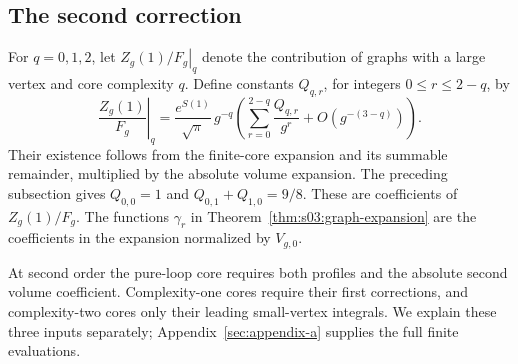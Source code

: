 \subsection{The second correction}
\label{subsec:s04:03}

For $q=0,1,2$, let $\left.Z_g(1)/F_g\right|_q$ denote the
contribution of graphs with a large vertex and core complexity $q$.
Define constants $Q_{q,r}$, for integers $0\leq r\leq2-q$, by
\begin{equation}\label{eq:s04:absolute-groups}
 \left.\frac{Z_g(1)}{F_g}\right|_q
 =\frac{e^{S(1)}}{\sqrt\pi}\,g^{-q}
       \left(\sum_{r=0}^{2-q}\frac{Q_{q,r}}{g^r}
                       +O(g^{-(3-q)})\right).
\end{equation}
Their existence follows from the finite-core expansion and its
summable remainder, multiplied by the absolute volume expansion.
The preceding subsection gives $Q_{0,0}=1$ and
$Q_{0,1}+Q_{1,0}=9/8$. These are coefficients of $Z_g(1)/F_g$.
The functions $\gamma_r$ in Theorem~\ref{thm:s03:graph-expansion}
are the coefficients in the expansion normalized by $V_{g,0}$.

At second order the pure-loop core requires both profiles and the
absolute second volume coefficient. Complexity-one cores require
their first corrections, and complexity-two cores only their leading
small-vertex integrals. We explain these three inputs separately;
Appendix~\ref{sec:appendix-a} supplies the full finite evaluations.

